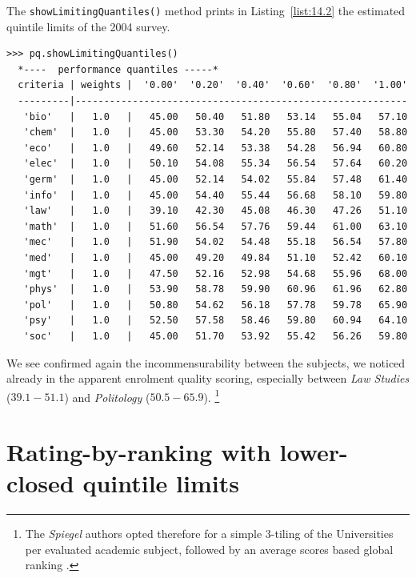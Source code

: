 The \texttt{showLimitingQuantiles()} method prints in Listing~\vref{list:14.2} the estimated quintile limits of the 2004 survey.
\begin{lstlisting}[caption={Estimated quintile limits of the 2004 survey},label=list:14.2,basicstyle=\ttfamily\scriptsize]
>>> pq.showLimitingQuantiles()
  *----  performance quantiles -----*
  criteria | weights |  '0.00'  '0.20'  '0.40'  '0.60'  '0.80'  '1.00'   
  ---------|----------------------------------------------------------
   'bio'   |   1.0   |   45.00   50.40   51.80   53.14   55.04   57.10  
   'chem'  |   1.0   |   45.00   53.30   54.20   55.80   57.40   58.80  
   'eco'   |   1.0   |   49.60   52.14   53.38   54.28   56.94   60.80  
   'elec'  |   1.0   |   50.10   54.08   55.34   56.54   57.64   60.20  
   'germ'  |   1.0   |   45.00   52.14   54.02   55.84   57.48   61.40  
   'info'  |   1.0   |   45.00   54.40   55.44   56.68   58.10   59.80  
   'law'   |   1.0   |   39.10   42.30   45.08   46.30   47.26   51.10  
   'math'  |   1.0   |   51.60   56.54   57.76   59.44   61.00   63.10  
   'mec'   |   1.0   |   51.90   54.02   54.48   55.18   56.54   57.80  
   'med'   |   1.0   |   45.00   49.20   49.84   51.10   52.42   60.10  
   'mgt'   |   1.0   |   47.50   52.16   52.98   54.68   55.96   68.00  
   'phys'  |   1.0   |   53.90   58.78   59.90   60.96   61.96   62.80  
   'pol'   |   1.0   |   50.80   54.62   56.18   57.78   59.78   65.90  
   'psy'   |   1.0   |   52.50   57.58   58.46   59.80   60.94   64.10  
   'soc'   |   1.0   |   45.00   51.70   53.92   55.42   56.26   59.80  
\end{lstlisting}
                     
We see confirmed again the incommensurability between the subjects, we noticed already in the apparent enrolment quality scoring, especially between \emph{Law Studies} ($39.1 - 51.1$) and \emph{Politology} ($50.5 - 65.9$). \footnote{The \emph{Spiegel} authors opted therefore for a simple 3-tiling of the Universities per evaluated academic subject, followed by an average \Borda scores based global ranking \citep{SPI-2004}.}


\section{Rating-by-ranking with lower-closed quintile limits}
\label{sec:14.3}



